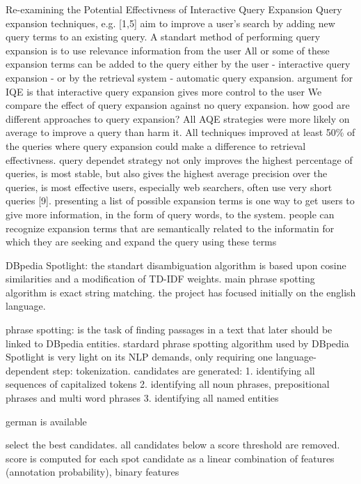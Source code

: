 Re-examining the Potential Effectivness of Interactive Query Expansion
Query expansion techniques, e.g. [1,5] aim to improve a user's search by adding new query terms to an existing query. A standart method of performing query expansion is to use relevance information from the user
All or some of these expansion terms can be added to the query either by the user - interactive query expansion - or by the retrieval system - automatic query expansion.
argument for IQE is that interactive query expansion gives more control to the user
We compare the effect of query expansion against no query expansion. how good are different approaches to query expansion? 
All AQE strategies were more likely on average to improve a query than harm it. All techniques improved at least 50\% of the queries where query expansion could make a difference to retrieval effectivness.
query dependet strategy not only improves the highest percentage of queries, is most stable, but also gives the highest average precision over the queries, is most effective
users, especially web searchers, often use very short queries [9]. presenting a list of possible expansion terms is one way to get users to give more information, in the form of query words, to the system.
people can recognize expansion terms that are semantically related to the informatin for which they are seeking and expand the query using these terms





DBpedia Spotlight:
the standart disambiguation algorithm is based upon cosine similarities and a modification of TD-IDF weights. main phrase spotting algorithm is exact string matching.
 the project has focused initially on the english language.

 phrase spotting: is the task of finding passages in a text that later should be linked to DBpedia entities. stardard phrase spotting algorithm used by DBpedia Spotlight is very light on its NLP demands, only requiring one language-dependent step: tokenization.
 candidates are generated:
 	1. identifying all sequences of capitalized tokens
 	2. identifying all noun phrases, prepositional phrases and multi word phrases
 	3. identifying all named entities

 german is available

 select the best candidates. all candidates below a score threshold are removed.
 score is computed for each spot candidate as a linear combination of features (annotation probability), binary features
 \cite{daiber2013improving}


